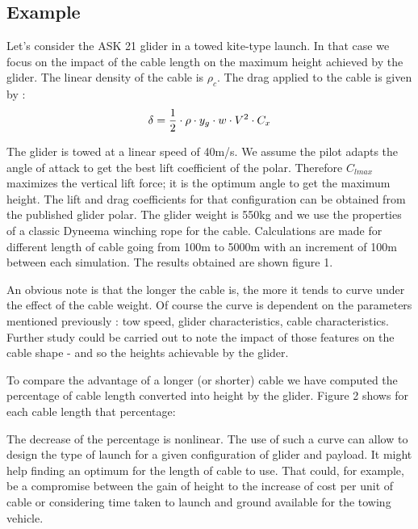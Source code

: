 \documentclass[11pt]{amsart}
\begin{document}
\subsection{Example}

Let's consider the ASK 21 glider in a towed kite-type launch. In that case we focus on the impact of the cable length on the maximum height achieved by the glider. The linear density of the cable is $\rho_c$. The drag applied to the cable is given by : 
\begin{equation}
	\centering
	\delta=\frac{1}{2}\cdot \rho \cdot y_g \cdot w \cdot V^2 \cdot C_x
	\label{eq:delta}
\end{equation}

The glider is towed at a linear speed of 40m/s. We assume the pilot adapts the angle of attack to get the best lift coefficient of the polar. Therefore $C_{lmax}$ maximizes the vertical lift force; it is the optimum angle to get the maximum height. The lift and drag coefficients for that configuration can be obtained from the published glider polar. The glider weight is 550kg and we use the properties of a classic Dyneema winching rope for the cable. Calculations are made for different length of cable going from 100m to 5000m with an increment of 100m between each simulation.
The results obtained are shown figure 1. 

An obvious note is that the longer the cable is, the more it tends to curve under the effect of the cable weight. Of course the curve is dependent on the parameters mentioned previously : tow speed, glider characteristics, cable characteristics. Further study could be carried out to note the impact of those features on the cable shape - and so the heights achievable by the glider. 

To compare the advantage of a longer (or shorter) cable we have computed the percentage of cable length converted into height by the glider. Figure 2 shows for each cable length that percentage: 


The decrease of the percentage is nonlinear. The use of such a curve can allow to design the type of launch for a given configuration of glider and payload. It might help finding an optimum for the length of cable to use. That could, for example, be a compromise between the gain of height to the increase of cost per unit of cable or considering time taken to launch and ground available for the towing vehicle. 
\end{document}
